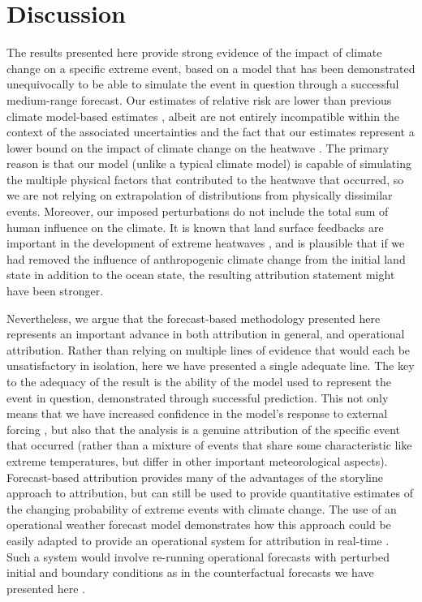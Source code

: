 \section{Discussion}\label{ch4:discussion}

  The results presented here provide strong evidence of the impact of climate change on a specific extreme event, based on a model that has been demonstrated unequivocally to be able to simulate the event in question through a successful medium-range forecast. Our estimates of relative risk are lower than previous climate model-based estimates \cite{philip_rapid_2021}, albeit are not entirely incompatible within the context of the associated uncertainties and the fact that our estimates represent a lower bound on the impact of climate change on the heatwave \cite[as was the case in][]{leach_forecast-based_2021}. The primary reason is that our model (unlike a typical climate model) is capable of simulating the multiple physical factors that contributed to the heatwave that occurred, so we are not relying on extrapolation of distributions from physically dissimilar events. Moreover, our imposed perturbations do not include the total sum of human influence on the climate. It is known that land surface feedbacks are important in the development of extreme heatwaves \cite{fischer_contribution_2007}, and is plausible that if we had removed the influence of anthropogenic climate change from the initial land state in addition to the ocean state, the resulting attribution statement might have been stronger.

  Nevertheless, we argue that the forecast-based methodology presented here represents an important advance in both attribution in general, and operational attribution. Rather than relying on multiple lines of evidence that would each be unsatisfactory in isolation, here we have presented a single adequate line. The key to the adequacy of the result is the ability of the model used to represent the event in question, demonstrated through successful prediction. This not only means that we have increased confidence in the model's response to external forcing \cite{palmer_simple_2018,palmer_nonlinear_1999}, but also that the analysis is a genuine attribution of the specific event that occurred (rather than a mixture of events that share some characteristic like extreme temperatures, but differ in other important meteorological aspects). Forecast-based attribution provides many of the advantages of the storyline approach to attribution, but can still be used to provide quantitative estimates of the changing probability of extreme events with climate change. The use of an operational weather forecast model demonstrates how this approach could be easily adapted to provide an operational system for attribution in real-time \cite[or potentially even in advance,][]{wang_initialized_2021}. Such a system would involve re-running operational forecasts with perturbed initial and boundary conditions as in the counterfactual forecasts we have presented here \cite{wehner_operational_2022}.

